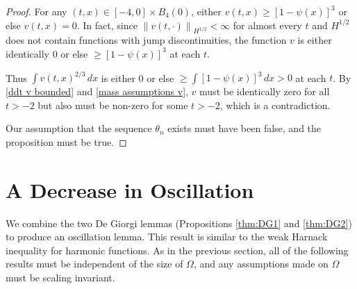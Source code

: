 \documentclass[11pt]{amsart}
\theoremstyle{remark}
\theoremstyle{definition}
\newcommand{\norm}[1]{\left\lVert#1\right\rVert}
\newcommand{\abs}[1]{\left\lvert #1 \right\rvert}
\begin{document}
\begin{proof}

For any $(t,x) \in [-4,0]\times B_4(0)$, either $v(t,x) \geq [1 - \psi(x)]^3$ or else $v(t,x) = 0$.  In fact, since $\norm{v(t,\cdot)}_{H^{1/2}} < \infty$ for almost every $t$ and $H^{1/2}$ does not contain functions with jump discontinuities, the function $v$ is either identically 0 or else $\geq [1-\psi(x)]^3$ at each $t$.  

Thus $\int v(t,x)^{2/3} \,dx$ is either 0 or else $\geq \int [1-\psi(x)]^3 \,dx > 0$ at each $t$.  By \eqref{ddt v bounded} and \eqref{mass assumptions v}, $v$ must be identically zero for all $t > -2$ but also must be non-zero for some $t > -2$, which is a contradiction.  

Our assumption that the sequence $\theta_n$ exists must have been false, and the proposition must be true.  

\end{proof}


\vskip1cm
\section{A Decrease in Oscillation} \label{sec:harnack}

We combine the two De Giorgi lemmas (Propositions \ref{thm:DG1} and \ref{thm:DG2}) to produce an oscillation lemma.  This result is similar to the weak Harnack inequality for harmonic functions.  As in the previous section, all of the following results must be independent of the size of $\Omega$, and any assumptions made on $\Omega$ must be scaling invariant.  
\end{document}
